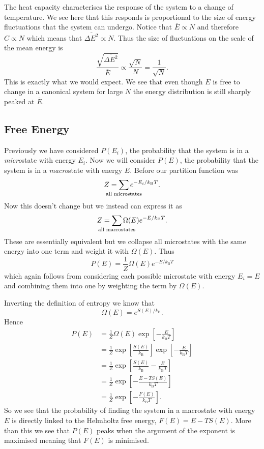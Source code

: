\documentclass[a4paper]{article}
\newcommand{\boltzmann}{k_\mathrm{B}}
\newcommand{\mean}[1]{\overline{#1}}
\begin{document}
    The heat capacity characterises the response of the system to a change of temperature.
    We see here that this responds is proportional to the size of energy fluctuations that the system can undergo.
    Notice that \(\mean{E} \propto N\) and therefore \(C\propto N\) which means that \(\mean{\Delta E^2}\propto N\).
    Thus the size of fluctuations on the scale of the mean energy is
    \[\frac{\sqrt{\mean{\Delta E^2}}}{\mean{E}} \propto \frac{\sqrt{N}}{N} = \frac{1}{\sqrt{N}}.\]
    This is exactly what we would expect.
    We see that even though \(E\) is free to change in a canonical system for large \(N\) the energy distribution is still sharply peaked at \(\mean{E}\).
    
    \subsection{Free Energy}
    Previously we have considered \(P(E_i)\), the probability that the system is in a \emph{micro}state with energy \(E_i\).
    Now we will consider \(P(E)\), the probability that the system is in a \emph{macro}state with energy \(E\).
    Before our partition function was
    \[Z = \sum_{\mathclap{\text{all microstates}}} e^{-E_i/\boltzmann T}.\]
    Now this doesn't change but we instead can express it as
    \[Z = \sum_{\mathclap{\text{all macrostates}}} \Omega(E)e^{-E/\boltzmann T}.\]
    These are essentially equivalent but we collapse all microstates with the same energy into one term and weight it with \(\Omega(E)\).
    Thus
    \[P(E) = \frac{1}{Z}\Omega(E)e^{-E/\boltzmann T}\]
    which again follows from considering each possible microstate with energy \(E_i = E\) and combining them into one by weighting the term by \(\Omega(E)\).
    
    Inverting the definition of entropy we know that
    \[\Omega(E) = e^{S(E)/\boltzmann}.\]
    Hence
    \begin{align*}
        P(E) &= \frac{1}{Z}\Omega(E)\exp\left[-\frac{E}{\boltzmann T}\right]\\
        &= \frac{1}{Z} \exp\left[\frac{S(E)}{\boltzmann}\right] \exp\left[-\frac{E}{\boltzmann T}\right]\\
        &= \frac{1}{Z} \exp\left[\frac{S(E)}{\boltzmann} - \frac{E}{\boltzmann T}\right]\\
        &= \frac{1}{Z} \exp\left[-\frac{E - TS(E)}{\boltzmann T}\right]\\
        &= \frac{1}{Z} \exp\left[-\frac{F(E)}{\boltzmann T}\right].
    \end{align*}
    So we see that the probability of finding the system in a macrostate with energy \(E\) is directly linked to the Helmholtz free energy, \(F(E) = E - TS(E)\).
    More than this we see that \(P(E)\) peaks when the argument of the exponent is maximised meaning that \(F(E)\) is minimised.
    
\end{document}
